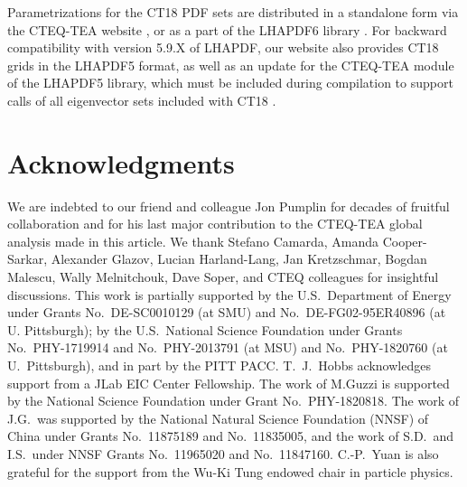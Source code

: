 Parametrizations for the CT18 PDF sets are distributed in a standalone
form via the CTEQ-TEA website \cite{CT18website}, or as a part of
the LHAPDF6 library \cite{LHAPDF6}. For backward compatibility with
version 5.9.X of LHAPDF, our website also provides CT18 grids in the
LHAPDF5 format, as well as an update for the CTEQ-TEA module
of the LHAPDF5 library, which must be included during compilation
to support calls of all eigenvector sets included with CT18 \cite{LHAPDF5}.





\section*{Acknowledgments}
We are indebted to our friend and colleague Jon Pumplin for decades of fruitful collaboration and for his last major contribution to the CTEQ-TEA global analysis made in this article.
We thank Stefano Camarda, Amanda Cooper-Sarkar, Alexander Glazov, Lucian Harland-Lang, Jan Kretzschmar, Bogdan Malescu, Wally Melnitchouk, Dave Soper, and CTEQ colleagues for insightful discussions. This work is partially supported by the U.S.~Department of Energy under Grants No.~DE-SC0010129 (at SMU) and No.~DE-FG02-95ER40896 (at U. Pittsburgh); by the U.S.~National Science Foundation
under Grants No.~PHY-1719914 and No.~PHY-2013791 (at MSU) and No.~PHY-1820760 (at U.~Pittsburgh), and in part by the PITT PACC. T.~J.~Hobbs acknowledges support from a JLab EIC Center Fellowship.
The work of M.Guzzi is supported by the National Science Foundation under Grant No.~PHY-1820818. The work of J.G.~was supported by the National Natural Science Foundation (NNSF)
of China under Grants No.~11875189 and No.~11835005, and the work of S.D.~and I.S.~under NNSF Grants No.~11965020 and No.~11847160. C.-P.~Yuan is also grateful for the support from
the Wu-Ki Tung endowed chair in particle physics.

